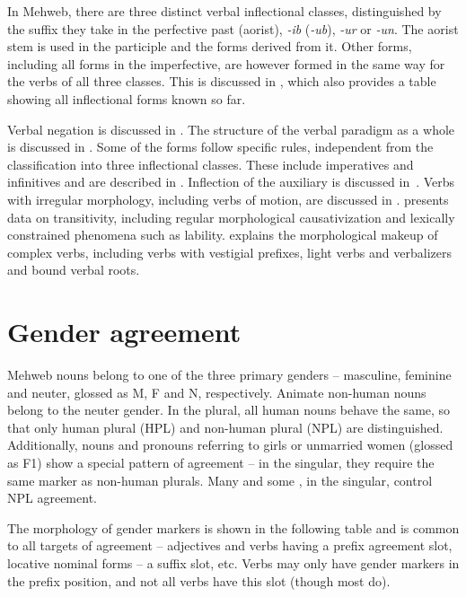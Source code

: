 \documentclass[output=paper]{langsci/langscibook}
\begin{document}
In Mehweb, there are three distinct verbal inflectional classes,
distinguished by the suffix they take in the perfective past (aorist),
\emph{-ib} (\emph{-ub}), \emph{-ur} or \emph{-un}. The aorist stem is
used in the participle and the forms derived from it. Other forms,
including all forms in the imperfective, are however formed in the same
way for the verbs of all three classes. This is discussed in ,
which also provides a table showing all inflectional forms known so far.

Verbal negation is discussed in . The structure of the verbal
paradigm as a whole is discussed in . Some of the forms follow
specific rules, independent from the classification into three
inflectional classes. These include imperatives and infinitives and are
described in . Inflection of the auxiliary is discussed in~.
Verbs with irregular morphology, including verbs of motion, are
discussed in .  presents data on transitivity,
including regular morphological causativization and lexically
constrained phenomena such as lability.  explains the
morphological makeup of complex verbs, including verbs with vestigial
prefixes, light verbs and verbalizers and bound verbal roots.

\section{Gender agreement}\label{gender-agreement}

Mehweb nouns belong to one of the three primary genders – masculine,
feminine and neuter, glossed as M, F and N, respectively. Animate
non-human nouns belong to the neuter gender. In the plural, all human
nouns behave the same, so that only human plural (HPL) and non-human
plural (NPL) are distinguished. Additionally, nouns and pronouns
referring to girls or unmarried women (glossed as F1) show a special
pattern of agreement – in the singular, they require the same marker as
non-human plurals. Many  and some , in the
singular, control NPL agreement.

The morphology of gender markers is shown in the following table and is
common to all targets of agreement – adjectives and verbs having a
prefix \mbox{agreement} slot, locative nominal forms – a suffix slot, etc.
Verbs may only have gender markers in the prefix position, and not all
verbs have this slot (though most do).
\end{document}
